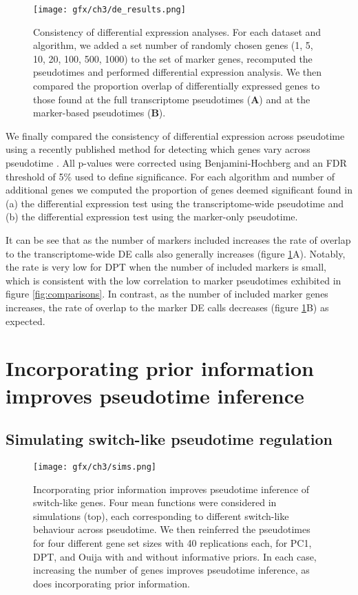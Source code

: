 \begin{figure}%
	\centering
	\texttt{[image: gfx/ch3/de\_results.png]}
	\caption[Consistency of differential expression analyses.]{Consistency of differential expression analyses. For each dataset and algorithm, we added a set number of randomly chosen genes (1, 5, 10, 20, 100, 500, 1000) to the set of marker genes, recomputed the pseudotimes and performed differential expression analysis. We then compared the proportion overlap of differentially expressed genes to those found at the full transcriptome pseudotimes (\textbf{A}) and at the marker-based pseudotimes (\textbf{B}).
	}
	\label{fig:de_results}
\end{figure}

We finally compared the consistency of differential expression across pseudotime using a recently published method for detecting which genes vary across pseudotime \cite{campbell2016switchde}. All p-values were corrected using Benjamini-Hochberg and an FDR threshold of 5\% used to define significance. For each algorithm and number of additional genes we computed the proportion of genes deemed significant found in (a) the differential expression test using the transcriptome-wide pseudotime and (b) the differential expression test using the marker-only pseudotime.

It can be see that as the number of markers included increases the rate of overlap to the transcriptome-wide DE calls also generally increases (figure \ref{fig:de_results}A). Notably, the rate is very low for DPT when the number of included markers is small, which is consistent with the low correlation to marker pseudotimes exhibited in figure \ref{fig:comparisons}. In contrast, as the number of included marker genes increases, the rate of overlap to the marker DE calls decreases (figure \ref{fig:de_results}B) as expected. 

\section{Incorporating prior information improves pseudotime inference}

\subsection{Simulating switch-like pseudotime regulation}

\begin{figure}%
	\centering
	\texttt{[image: gfx/ch3/sims.png]}
	\caption[Incorporating prior information improves pseudotime inference of switch-like genes.]{Incorporating prior information improves pseudotime inference of switch-like genes. Four mean functions were considered in simulations (top), each corresponding to different switch-like behaviour across pseudotime. We then reinferred the pseudotimes for four different gene set sizes with 40 replications each, for PC1, DPT, and Ouija with and without informative priors. In each case, increasing the number of genes improves pseudotime inference, as does incorporating prior information.}
	\label{fig:simulated_comparison}
\end{figure}

